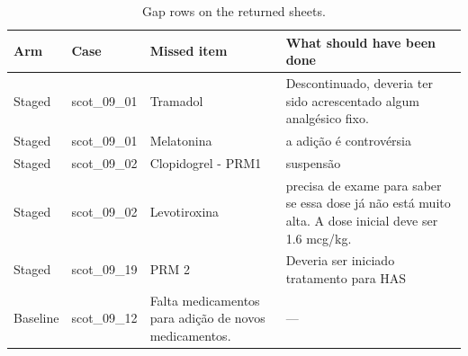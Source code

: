 \begin{table}[!ht]
\caption{Gap rows on the returned sheets.}
\label{tab:appgaps}
\centering
\footnotesize
\begin{tabular}{|l|l|p{5.5cm}|p{6.5cm}|}
\hline
Arm & Case & Missed item & What should have been done \\
\hline
Staged & scot\_09\_01 & Tramadol & Descontinuado, deveria ter sido acrescentado algum analgésico fixo. \\
\hline
Staged & scot\_09\_01 & Melatonina & a adição é controvérsia \\
\hline
Staged & scot\_09\_02 & Clopidogrel - PRM1 & suspensão \\
\hline
Staged & scot\_09\_02 & Levotiroxina & precisa de exame para saber se essa dose já não está muito alta. A dose inicial deve ser 1.6 mcg/kg. \\
\hline
Staged & scot\_09\_19 & PRM 2 & Deveria ser iniciado tratamento para HAS \\
\hline
Baseline & scot\_09\_12 & Falta medicamentos para adição de novos medicamentos. & --- \\
\hline
\end{tabular}
\end{table}
\endgroup
